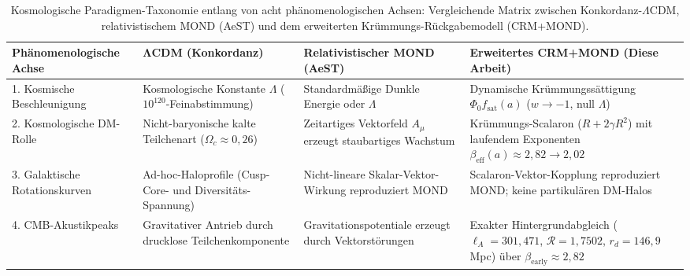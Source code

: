 \documentclass[aps,prd,twocolumn,superscriptaddress,nofootinbib,floatfix]{revtex4-2}
\begin{document}
\begin{table}[t]
\centering
\caption{Kosmologische Paradigmen-Taxonomie entlang von acht phänomenologischen Achsen: Vergleichende Matrix zwischen Konkordanz-$\Lambda$CDM, relativistischem MOND (AeST) und dem erweiterten Krümmungs-Rückgabemodell (CRM+MOND).}
\label{tab:cosmologische_taxonomie}
\footnotesize
\begin{tabular}{@{}llll@{}}
\toprule
\parbox[t]{0.17\textwidth}{\raggedright \textbf{Phänomenologische Achse}} &
\parbox[t]{0.25\textwidth}{\raggedright $\mathbf{\Lambda}$\textbf{CDM (Konkordanz)}} &
\parbox[t]{0.26\textwidth}{\raggedright \textbf{Relativistischer MOND (AeST)}} &
\parbox[t]{0.26\textwidth}{\raggedright \textbf{Erweitertes CRM+MOND (Diese Arbeit)}} \\
\midrule
\parbox[t]{0.17\textwidth}{\raggedright 1. Kosmische Beschleunigung} &
\parbox[t]{0.25\textwidth}{\raggedright Kosmologische Konstante $\Lambda$ ($10^{120}$-Feinabstimmung)} &
\parbox[t]{0.26\textwidth}{\raggedright Standardmäßige Dunkle Energie oder $\Lambda$} &
\parbox[t]{0.26\textwidth}{\raggedright Dynamische Krümmungssättigung $\Phi_0 f_{\mathrm{sat}}(a)$ ($w \to -1$, null $\Lambda$)} \\
\addlinespace
\parbox[t]{0.17\textwidth}{\raggedright 2. Kosmologische DM-Rolle} &
\parbox[t]{0.25\textwidth}{\raggedright Nicht-baryonische kalte Teilchenart ($\Omega_c \approx 0{,}26$)} &
\parbox[t]{0.26\textwidth}{\raggedright Zeitartiges Vektorfeld $A_\mu$ erzeugt staubartiges Wachstum} &
\parbox[t]{0.26\textwidth}{\raggedright Krümmungs-Scalaron ($R+2\gamma R^2$) mit laufendem Exponenten $\beta_{\mathrm{eff}}(a) \approx 2{,}82 \to 2{,}02$} \\
\addlinespace
\parbox[t]{0.17\textwidth}{\raggedright 3. Galaktische Rotationskurven} &
\parbox[t]{0.25\textwidth}{\raggedright Ad-hoc-Haloprofile (Cusp-Core- und Diversitäts-Spannung)} &
\parbox[t]{0.26\textwidth}{\raggedright Nicht-lineare Skalar-Vektor-Wirkung reproduziert MOND} &
\parbox[t]{0.26\textwidth}{\raggedright Scalaron-Vektor-Kopplung reproduziert MOND; keine partikulären DM-Halos} \\
\addlinespace
\parbox[t]{0.17\textwidth}{\raggedright 4. CMB-Akustikpeaks} &
\parbox[t]{0.25\textwidth}{\raggedright Gravitativer Antrieb durch drucklose Teilchenkomponente} &
\parbox[t]{0.26\textwidth}{\raggedright Gravitationspotentiale erzeugt durch Vektorstörungen} &
\parbox[t]{0.26\textwidth}{\raggedright Exakter Hintergrundabgleich ($\ell_A = 301{,}471$, $\mathcal{R} = 1{,}7502$, $r_d = 146{,}9$\,Mpc) über $\beta_{\mathrm{early}} \approx 2{,}82$} \\

\end{tabular}
\end{table}
\end{document}
